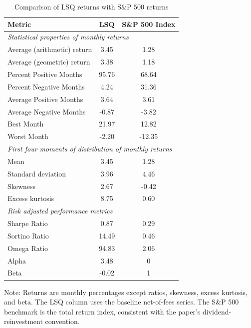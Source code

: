 \begin{table}[H]
\centering
\caption{Comparison of LSQ returns with S\&P 500 returns}
\label{tab:updated-table-2}
\begin{tabular}{lcc}
\toprule
\textbf{Metric} & \textbf{LSQ} & \textbf{S\&P 500 Index} \\
\midrule
\multicolumn{3}{l}{\emph{Statistical properties of monthly returns}} \\
\midrule
Average (arithmetic) return & 3.45 & 1.28 \\
Average (geometric) return & 3.38 & 1.18 \\
Percent Positive Months & 95.76 & 68.64 \\
Percent Negative Months & 4.24 & 31.36 \\
Average Positive Months & 3.64 & 3.61 \\
Average Negative Months & -0.87 & -3.82 \\
Best Month & 21.97 & 12.82 \\
Worst Month & -2.20 & -12.35 \\
\midrule
\multicolumn{3}{l}{\emph{First four moments of distribution of monthly returns}} \\
\midrule
Mean & 3.45 & 1.28 \\
Standard deviation & 3.96 & 4.46 \\
Skewness & 2.67 & -0.42 \\
Excess kurtosis & 8.75 & 0.60 \\
\midrule
\multicolumn{3}{l}{\emph{Risk adjusted performance metrics}} \\
\midrule
Sharpe Ratio & 0.87 & 0.29 \\
Sortino Ratio & 14.49 & 0.46 \\
Omega Ratio & 94.83 & 2.06 \\
Alpha & 3.48 & 0 \\
Beta & -0.02 & 1 \\
\bottomrule
\end{tabular}

\vspace{0.2cm}
\begin{minipage}{0.92\linewidth}
\footnotesize
Note: Returns are monthly percentages except ratios, skewness, excess kurtosis, and beta.
The LSQ column uses the baseline net-of-fees series.
The S\&P 500 benchmark is the total return index, consistent with the paper's dividend-reinvestment convention.
\end{minipage}
\end{table}

